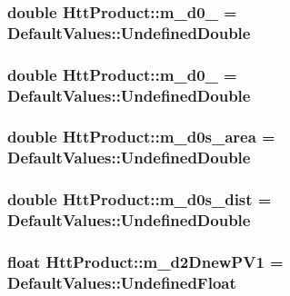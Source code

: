 \label{classHttProduct_a4cc75b7222fe46c6a57933454a69c859}
\hypertarget{classHttProduct_a60b4a2e75cda48c95d74b39cfb2af593}{
\subsubsection[{m\_\-d0\_\-1}]{\setlength{\rightskip}{0pt plus 5cm}double {\bf HttProduct::m\_\-d0\_} = DefaultValues::UndefinedDouble}}
\label{classHttProduct_a60b4a2e75cda48c95d74b39cfb2af593}
\hypertarget{classHttProduct_a0c1690a7af0dbfe2784f9a0987faeff3}{
\subsubsection[{m\_\-d0\_\-2}]{\setlength{\rightskip}{0pt plus 5cm}double {\bf HttProduct::m\_\-d0\_} = DefaultValues::UndefinedDouble}}
\label{classHttProduct_a0c1690a7af0dbfe2784f9a0987faeff3}
\hypertarget{classHttProduct_afa36e40279c564966ba388f4387d1cb4}{
\subsubsection[{m\_\-d0s\_\-area}]{\setlength{\rightskip}{0pt plus 5cm}double {\bf HttProduct::m\_\-d0s\_\-area} = DefaultValues::UndefinedDouble}}
\label{classHttProduct_afa36e40279c564966ba388f4387d1cb4}
\hypertarget{classHttProduct_aef0897c87944ba5924db4f50b37f9822}{
\subsubsection[{m\_\-d0s\_\-dist}]{\setlength{\rightskip}{0pt plus 5cm}double {\bf HttProduct::m\_\-d0s\_\-dist} = DefaultValues::UndefinedDouble}}
\label{classHttProduct_aef0897c87944ba5924db4f50b37f9822}
\hypertarget{classHttProduct_a5cd0dab7ec8daff69e1540b1436141f2}{
\subsubsection[{m\_\-d2DnewPV1}]{\setlength{\rightskip}{0pt plus 5cm}float {\bf HttProduct::m\_\-d2DnewPV1} = DefaultValues::UndefinedFloat}}
